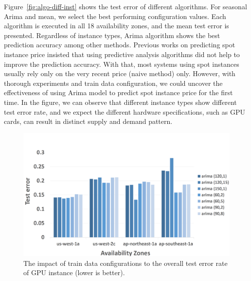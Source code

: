 \documentclass[graybox]{svmult}
\begin{document}
Figure~\ref{fig:algo-diff-inst} shows the test error of different algorithms. For seasonal Arima and mean, we select the best performing configuration values. Each algorithm is executed in all 18 availability zones, and the mean test error is presented. Regardless of instance types, Arima algorithm shows the best prediction accuracy among other methods. Previous works on predicting spot instance price insisted that using predictive analysis algorithms did not help to improve the prediction accuracy. With that, most systems using spot instances usually rely only on the very recent price (naive method) only. However, with thorough experiments and train data configuration, we could uncover the effectiveness of using Arima model to predict spot instance price for the first time. In the figure, we can observe that different instance types show different test error rate, and we expect the different hardware specifications, such as GPU cards, can result in distinct supply and demand pattern.  

\begin{figure}
  \centering\includegraphics[width=1.2\textwidth]{figures/g2-4m-l.png}\caption{The impact of train data configurations to the overall test error rate of GPU instance (lower is better).\label{fig:g2-param-diverse}}
\end{figure}
\end{document}
